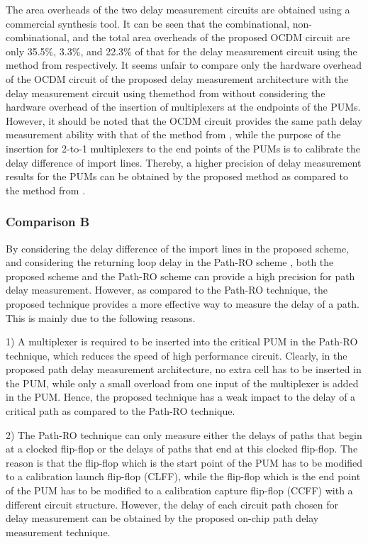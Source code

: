 The area overheads of the two delay measurement circuits are obtained using a commercial synthesis tool. It can be seen that the combinational, non-combinational, and the total area overheads of the proposed OCDM circuit are only 35.5\%, 3.3\%, and 22.3\% of that for the delay measurement circuit using the method from \cite{datta2004chip} respectively. It seems unfair to compare only the hardware overhead of the OCDM circuit of the proposed delay measurement architecture with the delay measurement circuit using themethod from \cite{datta2004chip} without considering the hardware overhead of the insertion of multiplexers at the endpoints of the PUMs. However, it should be noted that the OCDM circuit provides the same path delay measurement ability with that of the method from \cite{datta2004chip}, while the purpose of the insertion for 2-to-1 multiplexers to the end points of the PUMs is to calibrate the delay difference of import lines. Thereby, a higher precision of delay measurement results for the PUMs can be obtained by the proposed method as compared to the method from \cite{datta2004chip}.

\subsubsection{Comparison B}
By considering the delay difference of the import lines in the proposed scheme, and considering the returning loop delay in the Path-RO scheme \cite{wang2008path}, both the proposed scheme and the Path-RO scheme can provide a high precision for path delay measurement. However, as compared to the Path-RO technique, the proposed technique provides a more effective way to measure the delay of a path. This is mainly due to the following reasons.

1) A multiplexer is required to be inserted into the critical PUM in the Path-RO technique, which reduces the speed of high performance circuit. Clearly, in the proposed path delay measurement architecture, no extra cell has to be inserted in the PUM, while only a small overload from one input of the multiplexer is added in the PUM. Hence, the proposed technique has a weak impact to the delay of a critical path as compared to the Path-RO technique.

2) The Path-RO technique can only measure either the delays of paths that begin at a clocked flip-flop or the delays of paths that end at this clocked flip-flop. The reason is that the flip-flop which is the start point of the PUM has to be modified to a calibration launch flip-flop (CLFF), while the flip-flop which is the end point of the PUM has to be modified to a calibration capture flip-flop (CCFF) with a different circuit structure. However, the delay of each circuit path chosen for delay measurement can be obtained by the proposed on-chip path delay measurement technique.

